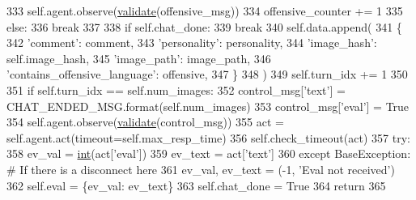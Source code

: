 \begin{DoxyCode}
333                     self.agent.observe(\hyperlink{namespaceparlai_1_1core_1_1worlds_afc3fad603b7bce41dbdc9cdc04a9c794}{validate}(offensive\_msg))
334                     offensive\_counter += 1
335                 \textcolor{keywordflow}{else}:
336                     \textcolor{keywordflow}{break}
337 
338             \textcolor{keywordflow}{if} self.chat\_done:
339                 \textcolor{keywordflow}{break}
340             self.data.append(
341                 \{
342                     \textcolor{stringliteral}{'comment'}: comment,
343                     \textcolor{stringliteral}{'personality'}: personality,
344                     \textcolor{stringliteral}{'image\_hash'}: self.image\_hash,
345                     \textcolor{stringliteral}{'image\_path'}: image\_path,
346                     \textcolor{stringliteral}{'contains\_offensive\_language'}: offensive,
347                 \}
348             )
349             self.turn\_idx += 1
350 
351         \textcolor{keywordflow}{if} self.turn\_idx == self.num\_images:
352             control\_msg[\textcolor{stringliteral}{'text'}] = CHAT\_ENDED\_MSG.format(self.num\_images)
353             control\_msg[\textcolor{stringliteral}{'eval'}] = \textcolor{keyword}{True}
354             self.agent.observe(\hyperlink{namespaceparlai_1_1core_1_1worlds_afc3fad603b7bce41dbdc9cdc04a9c794}{validate}(control\_msg))
355             act = self.agent.act(timeout=self.max\_resp\_time)
356             self.check\_timeout(act)
357             \textcolor{keywordflow}{try}:
358                 ev\_val = \hyperlink{namespacelanguage__model_1_1eval__ppl_a7d12ee00479673c5c8d1f6d01faa272a}{int}(act[\textcolor{stringliteral}{'eval'}])
359                 ev\_text = act[\textcolor{stringliteral}{'text'}]
360             \textcolor{keywordflow}{except} BaseException:  \textcolor{comment}{# If there is a disconnect here}
361                 ev\_val, ev\_text = (-1, \textcolor{stringliteral}{'Eval not received'})
362             self.eval = \{ev\_val: ev\_text\}
363         self.chat\_done = \textcolor{keyword}{True}
364         \textcolor{keywordflow}{return}
365 
\end{DoxyCode}
\mbox{\label{classpersonality__captions_1_1worlds_1_1MTurkPersonalityCaptionsWorld_a1fe4b499c8d38e26df4a7921a1672c32}} 

